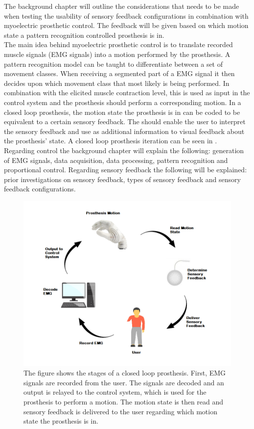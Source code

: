 The background chapter will outline the considerations that needs to be made when testing the usability of sensory feedback configurations in combination with myoelectric prosthetic control. The feedback will be given based on which motion state a pattern recognition controlled prosthesis is in. \\ 
The main idea behind myoelectric prosthetic control is to translate recorded muscle signals (EMG signals) into a motion performed by the prosthesis. A pattern recognition model can be taught to differentiate between a set of movement classes. When receiving a segmented part of a EMG signal it then decides upon which movement class that most likely is being performed. In combination with the elicited muscle contraction level, this is used as input in the control system and the prosthesis should perform a corresponding motion. \cite{Guanglin2010} In a closed loop prosthesis, the motion state the prosthesis is in can be coded to be equivalent to a certain sensory feedback. The should enable the user to interpret the sensory feedback and use as additional information to visual feedback about the prosthesis' state. \cite{Strbac2016} A closed loop prosthesis iteration can be seen in . \\
Regarding control the background chapter will explain the following: generation of EMG signals, data acquisition, data processing, pattern recognition and proportional control. Regarding sensory feedback the following will be explained: prior investigations on sensory feedback, types of sensory feedback and sensory feedback configurations. 

\begin{figure}[H]                 
	\includegraphics[width=.65\textwidth]{figures/closed_loop_pros}  
	\caption{The figure shows the stages of a closed loop prosthesis. First, EMG signals are recorded from the user. The signals are decoded and an output is relayed to the control system, which is used for the prosthesis to perform a motion. The motion state is then read and sensory feedback is delivered to the user regarding which motion state the prosthesis is in.}
	\label{fig:closed_loop_pros} 
\end{figure}